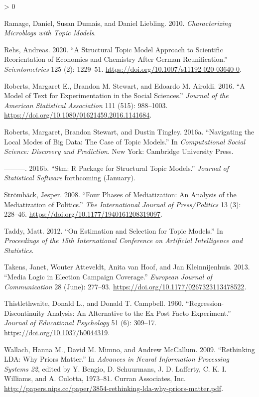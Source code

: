 \documentclass[
  12pt,
]{article}
\newlength{\cslhangindent}
\newenvironment{CSLReferences}[2] %
 {%
  \setlength{\parindent}{0pt}
  \ifodd #1 \everypar{\setlength{\hangindent}{\cslhangindent}}\ignorespaces\fi
  \ifnum #2 > 0
  \setlength{\parskip}{#2\baselineskip}
  \fi
 }%
 {}
\begin{document}
\begin{CSLReferences}{1}{0}
\leavevmode\hypertarget{ref-ramage_characterizing_2010}{}%
Ramage, Daniel, Susan Dumais, and Daniel Liebling. 2010.
\emph{Characterizing Microblogs with Topic Models}.

\leavevmode\hypertarget{ref-rehs_structural_2020}{}%
Rehs, Andreas. 2020. {``A Structural Topic Model Approach to Scientific
Reorientation of Economics and Chemistry After German Reunification.''}
\emph{Scientometrics} 125 (2): 1229--51.
\url{https://doi.org/10.1007/s11192-020-03640-0}.

\leavevmode\hypertarget{ref-roberts_model_2016}{}%
Roberts, Margaret E., Brandon M. Stewart, and Edoardo M. Airoldi. 2016.
{``A Model of Text for Experimentation in the Social Sciences.''}
\emph{Journal of the American Statistical Association} 111 (515):
988--1003. \url{https://doi.org/10.1080/01621459.2016.1141684}.

\leavevmode\hypertarget{ref-roberts_navigating_2016}{}%
Roberts, Margaret, Brandon Stewart, and Dustin Tingley. 2016a.
{``Navigating the Local Modes of Big Data: The Case of Topic Models.''}
In \emph{Computational Social Science: Discovery and Prediction}. New
York: Cambridge University Press.

\leavevmode\hypertarget{ref-roberts_stm:_2016}{}%
---------. 2016b. {``Stm: R Package for Structural Topic Models.''}
\emph{Journal of Statistical Software} forthcoming (January).

\leavevmode\hypertarget{ref-stromback_four_2008}{}%
Strömbäck, Jesper. 2008. {``Four Phases of Mediatization: An Analysis of
the Mediatization of Politics.''} \emph{The International Journal of
Press/Politics} 13 (3): 228--46.
\url{https://doi.org/10.1177/1940161208319097}.

\leavevmode\hypertarget{ref-taddy_estimation_2012}{}%
Taddy, Matt. 2012. {``On Estimation and Selection for Topic Models.''}
In \emph{Proceedings of the 15th International Conference on Artificial
Intelligence and Statistics}.

\leavevmode\hypertarget{ref-takens_media_2013}{}%
Takens, Janet, Wouter Atteveldt, Anita van Hoof, and Jan Kleinnijenhuis.
2013. {``Media Logic in Election Campaign Coverage.''} \emph{European
Journal of Communication} 28 (June): 277--93.
\url{https://doi.org/10.1177/0267323113478522}.

\leavevmode\hypertarget{ref-thistlethwaite_regression-discontinuity_1960}{}%
Thistlethwaite, Donald L., and Donald T. Campbell. 1960.
{``Regression-Discontinuity Analysis: An Alternative to the Ex Post
Facto Experiment.''} \emph{Journal of Educational Psychology} 51 (6):
309--17. \url{https://doi.org/10.1037/h0044319}.

\leavevmode\hypertarget{ref-wallach_rethinking_2009}{}%
Wallach, Hanna M., David M. Mimno, and Andrew McCallum. 2009.
{``Rethinking {LDA}: Why Priors Matter.''} In \emph{Advances in Neural
Information Processing Systems 22}, edited by Y. Bengio, D. Schuurmans,
J. D. Lafferty, C. K. I. Williams, and A. Culotta, 1973--81. Curran
Associates, Inc.
\url{http://papers.nips.cc/paper/3854-rethinking-lda-why-priors-matter.pdf}.

\end{CSLReferences}
\end{document}
